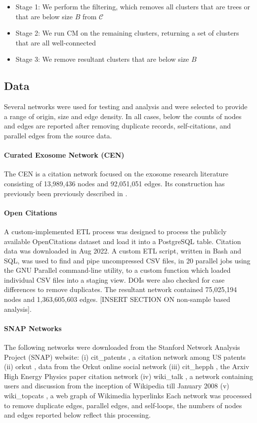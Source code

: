 \documentclass[12pt, oneside]{article}   	%
\begin{document}
\begin{itemize}
\item Stage 1: We perform the filtering, which removes all clusters that are trees or that are below size $B$ from $\mathcal{C}$
\item Stage 2: We run CM on the remaining clusters, returning a set of clusters that are all well-connected
\item Stage 3: We remove resultant clusters that are below size $B$ 
\end{itemize}


\subsection{Data} Several networks were used for testing and analysis and were selected to provide a range of origin, size and edge density. In all cases, below the counts of nodes and edges are reported after removing duplicate records, 
self-citations, and parallel edges from the source data. 

\paragraph{Curated Exosome Network (CEN)}
The CEN is a citation network focused on the exosome research literature consisting of 13,989,436 nodes and 92,051,051 edges. Its construction has previously been previously described in \cite{Jakatdar_2022}.  

\paragraph{Open Citations}
A custom-implemented ETL process was designed to process the publicly available OpenCitations dataset \citep{Peroni2020} and load it into a PostgreSQL table. Citation data was downloaded in Aug 2022. A custom ETL script, written in Bash and SQL, was used to find and pipe uncompressed CSV files, in 20 parallel jobs using the GNU Parallel command-line utility, to a custom function which loaded individual CSV files into a staging view. DOIs were also checked for case differences to remove duplicates.  The resultant network contained 75,025,194 nodes and 1,363,605,603 edges.  [INSERT SECTION ON non-sample based analysis].

\paragraph{SNAP Networks}The following networks were downloaded from the Stanford Network Analysis Project (SNAP) website: (i) cit\_patents \citep{Leskovec2005}, a citation network among US patents (ii) orkut \citep{Yang2013}, data from the Orkut online social network (iii) cit\_hepph \citep{Leskovec2005}, the Arxiv High Energy Physics paper citation network  (iv) wiki\_talk \citep{Leskovec2010}, a network containing users and discussion from the inception of Wikipedia till January 2008 (v) wiki\_topcats \citep{Yin2017}, a web graph of Wikimedia hyperlinks Each network was processed to remove duplicate edges, parallel edges, and self-loops, the numbers of nodes and edges reported below reflect this processing. 
\end{document}
